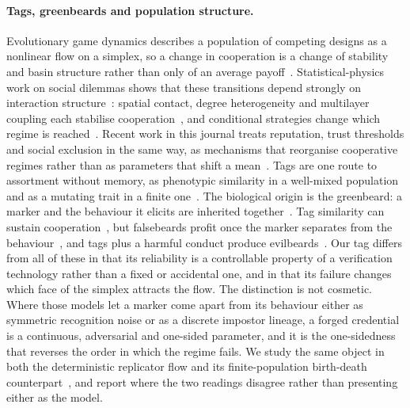 \documentclass[preprint,12pt]{elsarticle}
\theoremstyle{plain}
\theoremstyle{definition}
\begin{document}
\paragraph{Tags, greenbeards and population structure.}
Evolutionary game dynamics describes a population of competing designs as a
nonlinear flow on a simplex, so a change in cooperation is a change of
stability and basin structure rather than only of an average
payoff~\citep{taylor1978ess,hofbauer1998evolutionary,hofbauer2003evolutionary,sandholm2010population}.
Statistical-physics work on social dilemmas shows that these transitions depend
strongly on interaction structure~\citep{perc2017statphys}: spatial contact,
degree heterogeneity and multilayer coupling each stabilise
cooperation~\citep{nowak1992spatial,santos2005scale,wang2015multilayer}, and
conditional strategies change which regime is reached~\citep{szolnoki2012conditional}.
Recent work in this journal treats reputation, trust thresholds and social
exclusion in the same way, as mechanisms that reorganise cooperative regimes
rather than as parameters that shift a
mean~\citep{quan2019exclusion,zhu2025adaptive,zhang2026trust}. Tags are one
route to assortment without memory, as phenotypic similarity in a well-mixed
population~\citep{antal2009phenotypic} and as a mutating trait in a finite
one~\citep{traulsen2007chromodynamics,traulsen2003minimal}. The biological
origin is the greenbeard: a marker and the behaviour it elicits are inherited
together~\citep{hamilton1964genetical1,dawkins1976selfish}. Tag similarity can
sustain cooperation~\citep{riolo2001evolution}, but falsebeards profit once the
marker separates from the behaviour~\citep{roberts2002does,jansen2006altruism,gardner2010greenbeards},
and tags plus a harmful conduct produce
evilbeards~\citep{garcia2014evilbeards}. Our tag differs from all of these in
that its reliability is a controllable property of a verification technology
rather than a fixed or accidental one, and in that its failure changes which
face of the simplex attracts the flow. The distinction is not cosmetic. Where
those models let a marker come apart from its behaviour either as symmetric
recognition noise or as a discrete impostor lineage, a forged credential is a
continuous, adversarial and one-sided parameter, and it is the one-sidedness
that reverses the order in which the regime fails. We study the same object in
both the deterministic replicator flow and its finite-population birth-death
counterpart~\citep{traulsen2006stochastic}, and report where the two readings
disagree rather than presenting either as the model.
\end{document}
